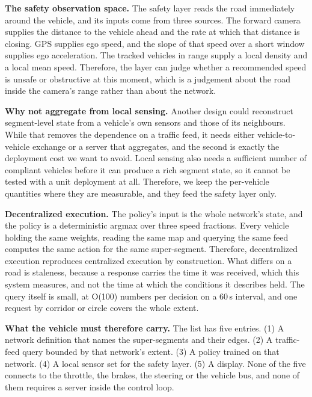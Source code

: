\noindent\textbf{The safety observation space.} The safety layer reads the road immediately around the vehicle, and its inputs come from three sources. The forward camera supplies the distance to the vehicle ahead and the rate at which that distance is closing. GPS supplies ego speed, and the slope of that speed over a short window supplies ego acceleration. The tracked vehicles in range supply a local density and a local mean speed. Therefore, the layer can judge whether a recommended speed is unsafe or obstructive at this moment, which is a judgement about the road inside the camera's range rather than about the network.

\noindent\textbf{Why not aggregate from local sensing.} Another design could reconstruct segment-level state from a vehicle's own sensors and those of its neighbours. While that removes the dependence on a traffic feed, it needs either vehicle-to-vehicle exchange or a server that aggregates, and the second is exactly the deployment cost we want to avoid. Local sensing also needs a sufficient number of compliant vehicles before it can produce a rich segment state, so it cannot be tested with a unit deployment at all. Therefore, we keep the per-vehicle quantities where they are measurable, and they feed the safety layer only.

\noindent\textbf{Decentralized execution.} The policy's input is the whole network's state, and the policy is a deterministic argmax over three speed fractions. Every vehicle holding the same weights, reading the same map and querying the same feed computes the same action for the same super-segment. Therefore, decentralized execution reproduces centralized execution by construction. What differs on a road is staleness, because a response carries the time it was received, which this system measures, and not the time at which the conditions it describes held. The query itself is small, at O(100) numbers per decision on a 60\,s interval, and one request by corridor or circle covers the whole extent.

\noindent\textbf{What the vehicle must therefore carry.} The list has five entries. (1) A network definition that names the super-segments and their edges. (2) A traffic-feed query bounded by that network's extent. (3) A policy trained on that network. (4) A local sensor set for the safety layer. (5) A display. None of the five connects to the throttle, the brakes, the steering or the vehicle bus, and none of them requires a server inside the control loop.
